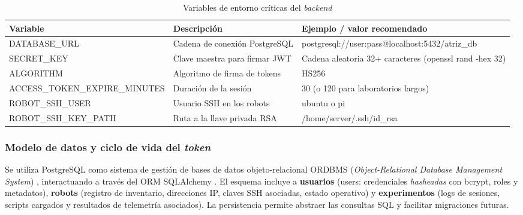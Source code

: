 \documentclass[12pt]{article}
\numberwithin{figure}{section}
\numberwithin{table}{section}
\def\code#1{#1}%
\def\file#1{#1}%
\newcommand{\code}[1]{\textcolor{codeblue}{\url{#1}}}
\newcommand{\file}[1]{\textcolor{darkblue}{\url{#1}}}
\begin{document}
\begin{table}[H]
\centering
\caption{Variables de entorno críticas del \textit{backend}}
\label{tab:env}
\begin{tabular}{p{}p{}p{}}
\toprule
\textbf{Variable} & \textbf{Descripción} & \textbf{Ejemplo / valor recomendado} \\
\midrule
\code{DATABASE\_URL} & Cadena de conexión PostgreSQL & \code{postgresql://user:pass@localhost:5432/atriz\_db} \\
\code{SECRET\_KEY} & Clave maestra para firmar JWT & Cadena aleatoria 32+ caracteres (\code{openssl rand -hex 32}) \\
\code{ALGORITHM} & Algoritmo de firma de tokens & HS256 \\
\code{ACCESS\_TOKEN\_EXPIRE\_MINUTES} & Duración de la sesión & 30 (o 120 para laboratorios largos) \\
\code{ROBOT\_SSH\_USER} & Usuario SSH en los robots & \code{ubuntu} o \code{pi} \\
\code{ROBOT\_SSH\_KEY\_PATH} & Ruta a la llave privada RSA & \file{/home/server/.ssh/id\_rsa} \\
\bottomrule
\end{tabular}
\end{table}


\subsubsection{Modelo de datos y ciclo de vida del \textit{token}}

Se utiliza PostgreSQL como sistema de gestión de bases de datos objeto-relacional ORDBMS (\textit{Object-Relational Database Management System}) \cite{PostgreSQL_Website}, interactuando a través del ORM SQLAlchemy \cite{SQLAlchemy_Website}. El esquema incluye a \textbf{usuarios} (\code{users}: credenciales \textit{hasheadas} con bcrypt, roles y metadatos), \textbf{robots} (registro de inventario, direcciones IP, claves SSH asociadas, estado operativo) y \textbf{experimentos} (logs de sesiones, scripts cargados y resultados de telemetría asociados). La persistencia permite abstraer las consultas SQL y facilitar migraciones futuras.
\end{document}
